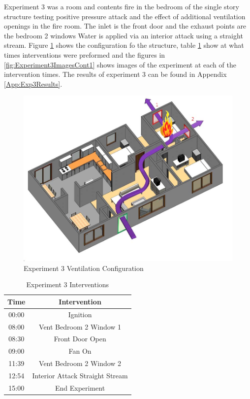 \documentclass{article}
\begin{document}
Experiment 3 was a room and contents fire in the bedroom of the single story structure testing positive pressure attack and the effect of additional ventilation openings in the fire room. The inlet is the front door and the exhaust points are the bedroom 2 windows Water is applied via an interior attack using a straight stream. Figure \ref{fig:Exp3VentConfig} shows the configuration fo the structure, table \ref{Table:Exp3Interventions} show at what times interventions were preformed and the figures in \ref{fig:Experiment3ImagesCont1} shows images of the experiment at each of the intervention times. The results of experiment 3 can be found in Appendix \ref{App:Exp3Results}.

 \begin{figure}[h!]
 	\centering
 	\includegraphics[width=5in]{0_Images/FireExperiments/Single_Story/Experiment_3.jpg}
 	\caption{Experiment 3 Ventilation Configuration}
 	\label{fig:Exp3VentConfig}
 \end{figure}

\begin{table}[H]
	\centering
	\caption{Experiment 3 Interventions}
	\begin{tabular}{|c|c|} 
		\hline
		Time & Intervention \\ \hline \hline
		00:00 & Ignition \\ \hline
		08:00 & Vent Bedroom 2 Window 1 \\ \hline
		08:30 & Front Door Open \\ \hline
		09:00 & Fan On \\ \hline
		11:39 & Vent Bedroom 2 Window 2 \\ \hline
		12:54 & Interior Attack Straight Stream \\ \hline
		15:00 & End Experiment \\ \hline
	\end{tabular}
	\label{Table:Exp3Interventions}
\end{table}
\end{document}
